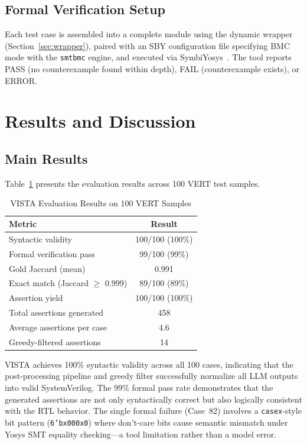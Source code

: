 \documentclass[conference]{IEEEtran}
\begin{document}
\subsection{Formal Verification Setup}
Each test case is assembled into a complete module using the dynamic wrapper (Section~\ref{sec:wrapper}), paired with an SBY configuration file specifying BMC mode with the \texttt{smtbmc} engine, and executed via SymbiYosys~\cite{symbiyosys}. The tool reports PASS (no counterexample found within depth), FAIL (counterexample exists), or ERROR.

\section{Results and Discussion}
\label{sec:results}

\subsection{Main Results}

Table~\ref{tab:results} presents the evaluation results across 100 VERT test samples.

\begin{table}[t]
\centering
\caption{VISTA Evaluation Results on 100 VERT Samples}
\label{tab:results}
\begin{tabular}{@{}lc@{}}
\toprule
\textbf{Metric} & \textbf{Result} \\
\midrule
Syntactic validity & 100/100 (100\%) \\
Formal verification pass & 99/100 (99\%) \\
Gold Jaccard (mean) & 0.991 \\
Exact match (Jaccard $\geq$ 0.999) & 89/100 (89\%) \\
Assertion yield & 100/100 (100\%) \\
Total assertions generated & 458 \\
Average assertions per case & 4.6 \\
Greedy-filtered assertions & 14 \\
\bottomrule
\end{tabular}
\end{table}

VISTA achieves 100\% syntactic validity across all 100 cases, indicating that the post-processing pipeline and greedy filter successfully normalize all LLM outputs into valid SystemVerilog. The 99\% formal pass rate demonstrates that the generated assertions are not only syntactically correct but also logically consistent with the RTL behavior. The single formal failure (Case~82) involves a \texttt{casex}-style bit pattern (\texttt{6'bx000x0}) where don't-care bits cause semantic mismatch under Yosys SMT equality checking---a tool limitation rather than a model error.
\end{document}
